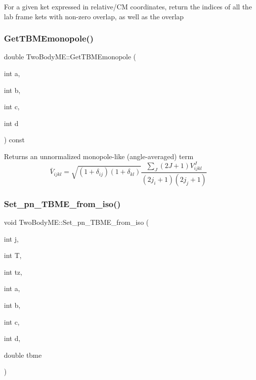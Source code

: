 For a given ket expressed in relative/\+CM coordinates, return the indices of all the lab frame kets with non-\/zero overlap, as well as the overlap \mbox{\label{classTwoBodyME_a41e1d7a520f31b57283b7817a35bceb7}} 
\subsubsection{\texorpdfstring{Get\+T\+B\+M\+Emonopole()}{GetTBMEmonopole()}}
{\footnotesize\ttfamily double Two\+Body\+M\+E\+::\+Get\+T\+B\+M\+Emonopole (\begin{DoxyParamCaption}\item[{int}]{a,  }\item[{int}]{b,  }\item[{int}]{c,  }\item[{int}]{d }\end{DoxyParamCaption}) const}

Returns an unnormalized monopole-\/like (angle-\/averaged) term \[ \bar{V}_{ijkl} = \sqrt{(1+\delta_{ij})(1+\delta_{kl})} \frac{\sum_{J}(2J+1) V_{ijkl}^J}{(2j_i+1)(2j_j+1)} \] \mbox{\label{classTwoBodyME_adc76bb65d2b3bc2006a70fb2a61464c9}} 
\subsubsection{\texorpdfstring{Set\+\_\+pn\+\_\+\+T\+B\+M\+E\+\_\+from\+\_\+iso()}{Set\_pn\_TBME\_from\_iso()}}
{\footnotesize\ttfamily void Two\+Body\+M\+E\+::\+Set\+\_\+pn\+\_\+\+T\+B\+M\+E\+\_\+from\+\_\+iso (\begin{DoxyParamCaption}\item[{int}]{j,  }\item[{int}]{T,  }\item[{int}]{tz,  }\item[{int}]{a,  }\item[{int}]{b,  }\item[{int}]{c,  }\item[{int}]{d,  }\item[{double}]{tbme }\end{DoxyParamCaption})}

